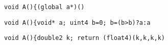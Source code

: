 \newsavebox{\ParserFailOne}
\begin{lrbox}{\ParserFailOne}
  \begin{minipage}{\textwidth}
    \begin{verbatim}
void A(){(global a*)()
    \end{verbatim}
  \end{minipage}
\end{lrbox}

\newsavebox{\ParserFailTwo}
\begin{lrbox}{\ParserFailTwo}
  \begin{minipage}{\textwidth}
    \begin{verbatim}
void A(){void* a; uint4 b=0; b=(b>b)?a:a
    \end{verbatim}
  \end{minipage}
\end{lrbox}

\newsavebox{\ParserFailThree}
\begin{lrbox}{\ParserFailThree}
  \begin{minipage}{\textwidth}
    \begin{verbatim}
void A(){double2 k; return (float4)(k,k,k,k)
    \end{verbatim}
  \end{minipage}
\end{lrbox}

